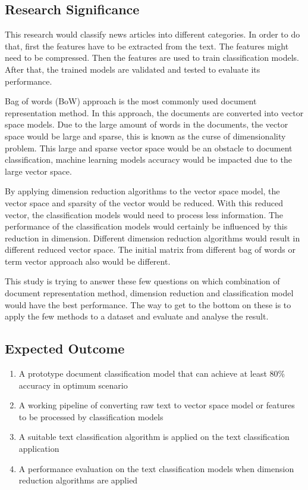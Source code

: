 \subsection{Research Significance}
This research would classify news articles into different categories. In order to do that, first the features have to be extracted from the text. The features might need to be compressed. Then the features are used to train classification models. After that, the trained models are validated and tested to evaluate its performance.

Bag of words (BoW) approach is the most commonly used document representation method. In this approach, the documents are converted into vector space models. Due to the large amount of words in the documents, the vector space would be large and sparse, this is known as the curse of dimensionality problem. This large and sparse vector space would be an obstacle to document classification, machine learning models accuracy would be impacted due to the large vector space.

By applying dimension reduction algorithms to the vector space model, the vector space and sparsity of the vector would be reduced. With this reduced vector, the classification models would need to process less information. The performance of the classification models would certainly be influenced by this reduction in dimension. Different dimension reduction algorithms would result in different reduced vector space. The initial matrix from different bag of words or term vector approach also would be different.

This study is trying to answer these few questions on which combination of document representation method, dimension reduction and classification model would have the best performance. The way to get to the bottom on these is to apply the few methods to a dataset and evaluate and analyse the result.\\


\subsection{Expected Outcome}
\begin{enumerate}
	\item A prototype document classification model that can achieve at least 80\% accuracy in optimum scenario
	\item A working pipeline of converting raw text to vector space model or features to be processed by classification models
	\item A suitable text classification algorithm is applied on the text classification application
	\item A performance evaluation on the text classification models when dimension reduction algorithms are applied
\end{enumerate}

